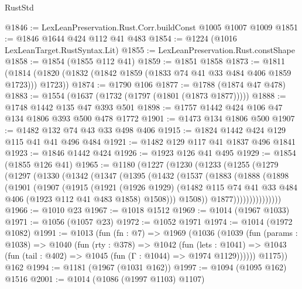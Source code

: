 \begin{lexlean}{RustStd}
\begin{coremodule}
@1846 := LexLeanPreservation.Rust.Corr.buildConst @1005 @1007 @1009
@1851 := @1846 @1644 @424 @112 @41 @483
@1854 := @1224 (@1016 LexLeanTarget.RustSyntax.Lit)
@1855 := LexLeanPreservation.Rust.constShape
@1858 := @1854 (@1855 @112 @41)
@1859 := @1851 @1858
@1873 := @1811 (@1814 (@1820 (@1832 (@1842 @1859 (@1833 @74 @41 @33 @484 @406 @1859 @1723))) @1723))
@1874 := @1790 @106
@1877 := @1788 (@1874 @47 @478)
@1883 := @1554 (@1637 (@1732 (@1797 (@1801 (@1873 @1877)))))
@1888 := @1748 @1442 @135 @47 @393 @501
@1898 := @1757 @1442 @424 @106 @47 @134 @1806 @393 @500 @478 @1772
@1901 := @1473 @134 @1806 @500
@1907 := @1482 @132 @74 @43 @33 @498 @406
@1915 := @1824 @1442 @424 @129 @115 @41 @41 @496 @484
@1921 := @1482 @129 @117 @41 @1837 @496 @1841
@1923 := @1846 @1442 @424
@1926 := @1923 @126 @41 @495
@1929 := @1854 (@1855 @126 @41)
@1965 := @1180
    (@1227
      (@1230
        (@1233
          (@1255
            (@1279
              (@1297
                (@1330
                  (@1342
                    (@1347
                      (@1395
                        (@1432
                          (@1537
                            (@1883
                              (@1888
                                (@1898
                                  (@1901
                                    (@1907
                                      (@1915
                                        (@1921
                                          (@1926 @1929)
                                          (@1482
                                            @115
                                            @74
                                            @41
                                            @33
                                            @484
                                            @406
                                            (@1923 @112 @41 @483 @1858)
                                            @1508)))
                                      @1508))
                                  @1877)))))))))))))))
@1966 := @1010 @23
@1967 := @1018 @1512
@1969 := @1014 (@1967 @1033)
@1971 := @1056 (@1057 @23)
@1972 := @1052 @1971
@1974 := @1014 (@1972 @1082)
@1991 := @1013
    (fun (fn : @7) =>
    @1969
      (@1036
        (@1039
          (fun (params : @1038) =>
          @1040
            (fun (rty : @378) =>
            @1042
              (fun (lets : @1041) =>
              @1043 (fun (tail : @402) => @1045 (fun (Γ : @1044) => @1974 @1129))))))
        @1175))
    @162
@1994 := @1181 (@1967 (@1031 @162))
@1997 := @1094 (@1095 @162) @1516
@2001 := @1014 (@1086 (@1997 @1103) @1107)

\end{coremodule}
\end{lexlean}
